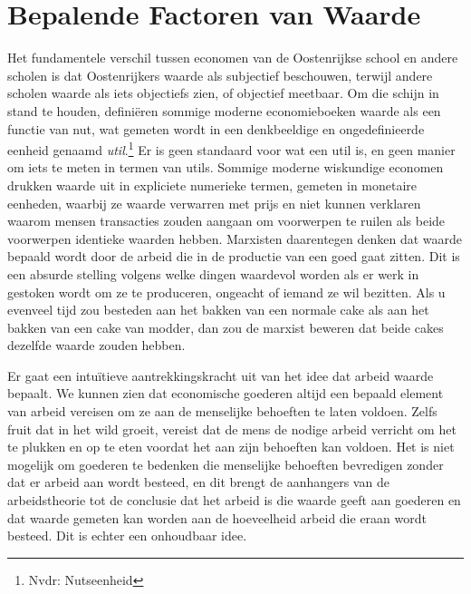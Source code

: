 \section{Bepalende Factoren van Waarde}

Het fundamentele verschil tussen economen van de Oostenrijkse school en andere scholen is dat Oostenrijkers waarde als subjectief beschouwen, terwijl andere scholen waarde als iets objectiefs zien, of objectief meetbaar. Om die schijn in stand te houden, definiëren sommige moderne economieboeken waarde als een functie van nut, wat gemeten wordt in een denkbeeldige en ongedefinieerde eenheid genaamd \textit{util}.\footnote{Nvdr: Nutseenheid} Er is geen standaard voor wat een util is, en geen manier om iets te meten in termen van utils. Sommige moderne wiskundige economen drukken waarde uit in expliciete numerieke termen, gemeten in monetaire eenheden, waarbij ze waarde verwarren met prijs en niet kunnen verklaren waarom mensen transacties zouden aangaan om voorwerpen te ruilen als beide voorwerpen identieke waarden hebben. Marxisten daarentegen denken dat waarde bepaald wordt door de arbeid die in de productie van een goed gaat zitten. Dit is een absurde stelling volgens welke dingen waardevol worden als er werk in gestoken wordt om ze te produceren, ongeacht of iemand ze wil bezitten. Als u evenveel tijd zou besteden aan het bakken van een normale cake als aan het bakken van een cake van modder, dan zou de marxist beweren dat beide cakes dezelfde waarde zouden hebben.

Er gaat een intuïtieve aantrekkingskracht uit van het idee dat arbeid waarde bepaalt. We kunnen zien dat economische goederen altijd een bepaald element van arbeid vereisen om ze aan de menselijke behoeften te laten voldoen. Zelfs fruit dat in het wild groeit, vereist dat de mens de nodige arbeid verricht om het te plukken en op te eten voordat het aan zijn behoeften kan voldoen. Het is niet mogelijk om goederen te bedenken die menselijke behoeften bevredigen zonder dat er arbeid aan wordt besteed, en dit brengt de aanhangers van de arbeidstheorie tot de conclusie dat het arbeid is die waarde geeft aan goederen en dat waarde gemeten kan worden aan de hoeveelheid arbeid die eraan wordt besteed. Dit is echter een onhoudbaar idee. 

